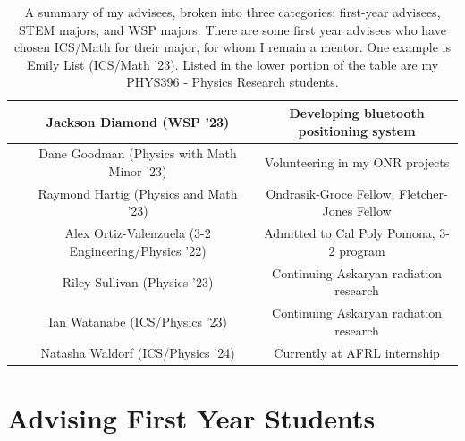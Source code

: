 \documentclass[../../main.tex]{subfiles}
\begin{document}
\begin{table}[ht]
\begin{tabular}{| c | c | c |}
& Jackson Diamond (WSP '23) & Developing bluetooth positioning system \\ \hline
& Dane Goodman (Physics with Math Minor '23) & Volunteering in my ONR projects \\ \hline
& Raymond Hartig (Physics and Math '23) & Ondrasik-Groce Fellow, Fletcher-Jones Fellow \\ \hline
& Alex Ortiz-Valenzuela (3-2 Engineering/Physics '22) & Admitted to Cal Poly Pomona, 3-2 program \\ \hline
& Riley Sullivan (Physics '23) & Continuing Askaryan radiation research \\ \hline
& Ian Watanabe (ICS/Physics '23) & Continuing Askaryan radiation research \\ \hline
& Natasha Waldorf (ICS/Physics '24) & Currently at AFRL internship \\ \hline
\end{tabular}
\caption{\label{tab:advisees} A summary of my advisees, broken into three categories: first-year advisees, STEM majors, and WSP majors.  There are some first year advisees who have chosen ICS/Math for their major, for whom I remain a mentor.  One example is Emily List (ICS/Math '23).  Listed in the lower portion of the table are my PHYS396 - Physics Research students.}
\end{table}

\section{Advising First Year Students}
\end{document}
